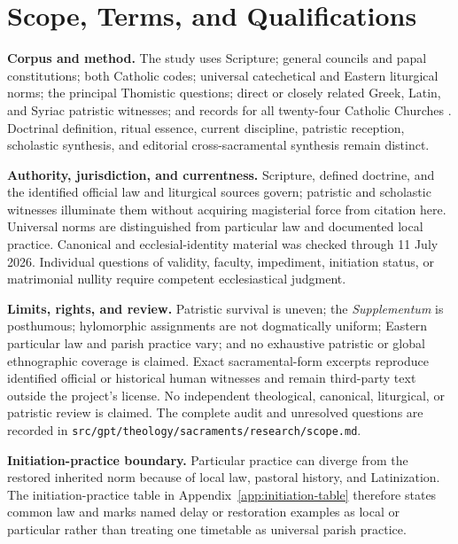 \section{Scope, Terms, and Qualifications}

\begin{studyframe}
\textbf{Corpus and method.} The study uses Scripture; general councils and papal constitutions; both Catholic codes; universal catechetical and Eastern liturgical norms; the principal Thomistic questions; direct or closely related Greek, Latin, and Syriac patristic witnesses; and records for all twenty-four Catholic Churches . Doctrinal definition, ritual essence, current discipline, patristic reception, scholastic synthesis, and editorial cross-sacramental synthesis remain distinct.

\textbf{Authority, jurisdiction, and currentness.} Scripture, defined doctrine, and the identified official law and liturgical sources govern; patristic and scholastic witnesses illuminate them without acquiring magisterial force from citation here. Universal norms are distinguished from particular law and documented local practice. Canonical and ecclesial-identity material was checked through 11 July 2026. Individual questions of validity, faculty, impediment, initiation status, or matrimonial nullity require competent ecclesiastical judgment.

\textbf{Limits, rights, and review.} Patristic survival is uneven; the \emph{Supplementum} is posthumous; hylomorphic assignments are not dogmatically uniform; Eastern particular law and parish practice vary; and no exhaustive patristic or global ethnographic coverage is claimed. Exact sacramental-form excerpts reproduce identified official or historical human witnesses and remain third-party text outside the project's license. No independent theological, canonical, liturgical, or patristic review is claimed. The complete audit and unresolved questions are recorded in \nolinkurl{src/gpt/theology/sacraments/research/scope.md}.

\textbf{Initiation-practice boundary.} Particular practice can diverge from the restored inherited norm because of local law, pastoral history, and Latinization. The initiation-practice table in Appendix~\ref{app:initiation-table} therefore states common law and marks named delay or restoration examples as local or particular rather than treating one timetable as universal parish practice.
\end{studyframe}

\begingroup
\let\section\subsection

\endgroup
